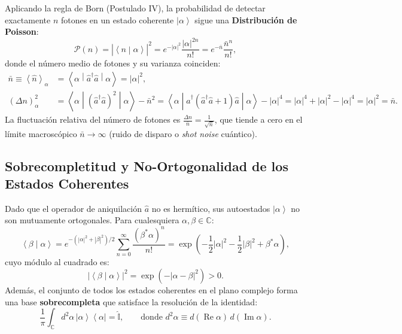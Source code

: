 \documentclass[11pt,a4paper,twoside]{report}
\theoremstyle{definition}
\theoremstyle{plain}
\theoremstyle{remark}
\newcommand{\ket}[1]{\left| #1 \right\rangle}
\newcommand{\braket}[2]{\left\langle #1 \middle| #2 \right\rangle}
\newcommand{\ketbra}[2]{\left| #1 \right\rangle\!\left\langle #2 \right|}
\newcommand{\mel}[3]{\left\langle #1 \middle| #2 \middle| #3 \right\rangle}
\newcommand{\expval}[1]{\left\langle #1 \right\rangle}
\newcommand{\op}[1]{\hat{#1}}
\newcommand{\ident}{\hat{\mathbb{I}}}
\begin{document}
Aplicando la regla de Born (Postulado IV), la probabilidad de detectar exactamente $n$ fotones en un estado coherente $\ket{\alpha}$ sigue una \textbf{Distribución de Poisson}:
\begin{equation}
    \mathcal{P}(n) = |\braket{n}{\alpha}|^2 = e^{-|\alpha|^2}\frac{|\alpha|^{2n}}{n!} = e^{-\bar{n}}\frac{\bar{n}^n}{n!},
\end{equation}
donde el número medio de fotones y su varianza coinciden:
\begin{align}
    \bar{n} \equiv \expval{\op{n}}_\alpha &= \mel{\alpha}{\op{a}^\dagger\op{a}}{\alpha} = |\alpha|^2, \\
    (\Delta n)^2_\alpha &= \mel{\alpha}{(\op{a}^\dagger\op{a})^2}{\alpha} - \bar{n}^2 = \mel{\alpha}{\op{a}^\dagger(\op{a}^\dagger\op{a} + 1)\op{a}}{\alpha} - |\alpha|^4 = |\alpha|^4 + |\alpha|^2 - |\alpha|^4 = |\alpha|^2 = \bar{n}.
\end{align}
La fluctuación relativa del número de fotones es $\frac{\Delta n}{\bar{n}} = \frac{1}{\sqrt{\bar{n}}}$, que tiende a cero en el límite macroscópico $\bar{n} \to \infty$ (ruido de disparo o \textit{shot noise} cuántico).

\subsection{Sobrecompletitud y No-Ortogonalidad de los Estados Coherentes}

Dado que el operador de aniquilación $\op{a}$ no es hermítico, sus autoestados $\ket{\alpha}$ no son mutuamente ortogonales. Para cualesquiera $\alpha, \beta \in \mathbb{C}$:
\begin{equation}
    \braket{\beta}{\alpha} = e^{-(|\alpha|^2 + |\beta|^2)/2}\sum_{n=0}^{\infty}\frac{(\beta^*\alpha)^n}{n!} = \exp\left(-\frac{1}{2}|\alpha|^2 - \frac{1}{2}|\beta|^2 + \beta^*\alpha\right),
\end{equation}
cuyo módulo al cuadrado es:
\begin{equation}
    |\braket{\beta}{\alpha}|^2 = \exp\left(-|\alpha - \beta|^2\right) > 0.
\end{equation}
Además, el conjunto de todos los estados coherentes en el plano complejo forma una base \textbf{sobrecompleta} que satisface la resolución de la identidad:
\begin{equation}
    \frac{1}{\pi}\int_{\mathbb{C}} d^2\alpha \, \ketbra{\alpha}{\alpha} = \ident, \qquad \text{donde } d^2\alpha \equiv d(\operatorname{Re}\alpha)\,d(\operatorname{Im}\alpha).
\end{equation}
\end{document}
